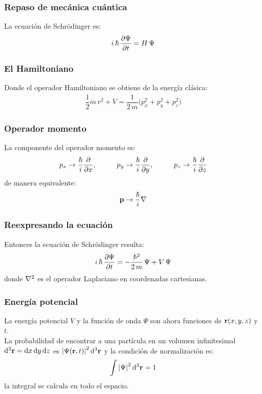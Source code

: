 \documentclass[12pt]{beamer}
\begin{document}
\begin{frame}
\frametitle{Repaso de mecánica cuántica}
La ecuación de Schrödinger es:
\begin{align}
i \, \hbar \, \pdv{\Psi}{t} = H \, \Psi
\label{eq:ecuacion_04_01}
\end{align}
\end{frame}
\begin{frame}
\frametitle{El Hamiltoniano}
Donde el operador Hamiltoniano se obtiene de la energía clásica:
\begin{align*}
\dfrac{1}{2} m \, v^{2} + V = \dfrac{1}{2 \, m} \big( p_{x}^{2} + p_{y}^{2} + p_{z}^{2} \big)
\end{align*}
\end{frame}
\begin{frame}
\frametitle{Operador momento}
La componente del operador momento es:
\begin{align}
p_{x} \to \dfrac{\hbar}{i} \pdv{x}, \hspace{1cm} p_{y} \to \dfrac{\hbar}{i} \pdv{y}, \hspace{1cm} p_{z} \to \dfrac{\hbar}{i} \pdv{z}
\label{eq:ecuacion_04_02}
\end{align}
\pause
de manera equivalente:
\begin{align}
\vb{p} \to \dfrac{\hbar}{i} \nabla
\end{align}
\end{frame}
\begin{frame}
\frametitle{Reexpresando la ecuación}
Entonces la ecuación de Schrödinger resulta:
\begin{align}
i \, \hbar \, \pdv{\Psi}{t} = -\dfrac{\hbar^{2}}{2 \, m} \, \Psi + V \, \Psi
\label{eq:ecuacion_04_04}    
\end{align}
donde $\laplacian$ es el operador Laplaciano en coordenadas cartesianas.
\end{frame}
\begin{frame}
\frametitle{Energía potencial}
La energía potencial $V$ y la función de onda $\Psi$ son ahora funciones de $\vb{r}(x, y, z)$ y $t$.
\pause
\\
\bigskip
La probabilidad de encontrar a una partícula en un volumen infinitesimal $\dd[3]{\vb{r}} = \dd{x} \dd{y} \dd{z}$ es $\abs{\Psi(\vb{r}, t)}^{2} \dd[3]{\vb{r}}$ y la condición de normalización es:
\pause
\begin{align}
    \int \abs{\Psi}^{2} \dd[3]{\vb{r}} = 1
    \label{eq:ecuacion_04_06}
\end{align}
la integral se calcula en todo el espacio. 
\end{frame}
\end{document}

